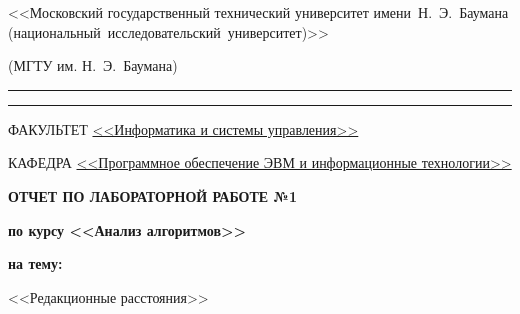 \begin{titlepage}
\begin{center}
\begin{minipage}{0.85\textwidth}
{                    %
                    {<<Московский государственный технический университет имени~Н.~Э.~Баумана (национальный~исследовательский~университет)>>}

                    {(МГТУ им. Н.~Э.~Баумана)}
                    \vspace{0.1cm}
                }
            \end{minipage}

        \vspace{0.2cm}
        \rule{\linewidth}{2.8pt}
        \rule[3ex]{\linewidth}{1pt}

        \begin{flushleft}
            {ФАКУЛЬТЕТ \uline{<<Информатика и системы управления>> \hfill}}

            \vspace{0.5cm}

            {КАФЕДРА \uline{<<Программное обеспечение ЭВМ и информационные технологии>> \hfill}}
        \end{flushleft}

        \vfill

        {
            \Large{\textbf{
                {ОТЧЕТ ПО ЛАБОРАТОРНОЙ РАБОТЕ №1}
            }}

            \Large{\textbf{
                {по курсу <<Анализ алгоритмов>>}
            }}

            \Large{\textbf{
                {на тему:}
            }}

            \large{<<Редакционные расстояния>>}

            \vspace{0.5cm}
        }

        \vspace{0.5cm}



\end{center}
\end{titlepage}
